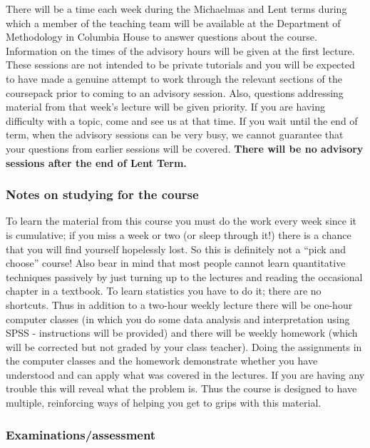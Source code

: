 \documentclass[11pt,a4paper,openany]{book}
\begin{document}
There will be a time each week during the Michaelmas and Lent terms
during which a member of the teaching team will be available at the
Department of Methodology in Columbia House to answer questions about
the course. Information on the times of the advisory hours will be given
at the first lecture. These sessions are not intended to be private
tutorials and you will be expected to have made a genuine attempt to
work through the relevant sections of the coursepack prior to coming to
an advisory session. Also, questions addressing material from that
week's lecture will be given priority. If you are having difficulty with
a topic, come and see us at that time. If you wait until the end of
term, when the advisory sessions can be very busy, we cannot guarantee
that your questions from earlier sessions will be covered. \textbf{There
will be no advisory sessions after the end of Lent Term.}

\subsubsection*{Notes on studying for the
course}\label{notes-on-studying-for-the-course}

To learn the material from this course you must do the work every week
since it is cumulative; if you miss a week or two (or sleep through it!)
there is a chance that you will find yourself hopelessly lost. So this
is definitely not a ``pick and choose'' course! Also bear in mind that
most people cannot learn quantitative techniques passively by just
turning up to the lectures and reading the occasional chapter in a
textbook. To learn statistics you have to do it; there are no shortcuts.
Thus in addition to a two-hour weekly lecture there will be one-hour
computer classes (in which you do some data analysis and interpretation
using SPSS - instructions will be provided) and there will be weekly
homework (which will be corrected but not graded by your class teacher).
Doing the assignments in the computer classes and the homework
demonstrate whether you have understood and can apply what was covered
in the lectures. If you are having any trouble this will reveal what the
problem is. Thus the course is designed to have multiple, reinforcing
ways of helping you get to grips with this material.

\subsubsection*{Examinations/assessment}\label{examinationsassessment}
\end{document}
